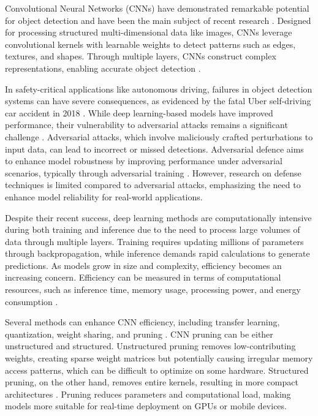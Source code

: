 \documentclass[10pt]{cai}
\begin{document}
Convolutional Neural Networks (CNNs) have demonstrated remarkable potential for object detection and have been the main subject of recent research \cite{zou2023object}. Designed for processing structured multi-dimensional data like images, CNNs leverage convolutional kernels with learnable weights to detect patterns such as edges, textures, and shapes. Through multiple layers, CNNs construct complex representations, enabling accurate object detection \cite{electronics10202470}.

In safety-critical applications like autonomous driving, failures in object detection systems can have severe consequences, as evidenced by the fatal Uber self-driving car accident in 2018 \cite{Kohli_2019}. While deep learning-based models have improved performance, their vulnerability to adversarial attacks remains a significant challenge \cite{zhang2019adversarially}. Adversarial attacks, which involve maliciously crafted perturbations to input data, can lead to incorrect or missed detections. Adversarial defence aims to enhance model robustness by improving performance under adversarial scenarios, typically through adversarial training \cite{costa2023deep}. 
However, research on defense techniques is limited compared to adversarial attacks, emphasizing the need to enhance model reliability for real-world applications.

Despite their recent success, deep learning methods are computationally intensive during both training and inference due to the need to process large volumes of data through multiple layers. Training requires updating millions of parameters through backpropagation, while inference demands rapid calculations to generate predictions. As models grow in size and complexity, efficiency becomes an increasing concern. Efficiency can be measured in terms of computational resources, such as inference time, memory usage, processing power, and energy consumption \cite{electronics11060945}. 

Several methods can enhance CNN efficiency, including transfer learning, quantization, weight sharing, and pruning \cite{HABIB20224244}. CNN pruning can be either unstructured and structured. Unstructured pruning removes low-contributing weights, creating sparse weight matrices but potentially causing irregular memory access patterns, which can be difficult to optimize on some hardware. Structured pruning, on the other hand, removes entire kernels, resulting in more compact architectures \cite{beforehydra}. Pruning reduces parameters and computational load, making models more suitable for real-time deployment on GPUs or mobile devices.
\end{document}
